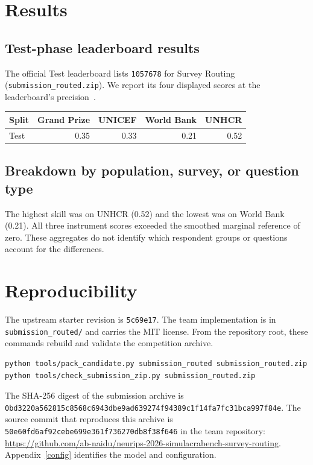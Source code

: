 \documentclass{article}
\begin{document}
\newpage
\section{Results}
\subsection{Test-phase leaderboard results}
The official Test leaderboard lists \texttt{1057678} for Survey Routing
(\texttt{submission\_routed.zip}). We report its four displayed scores at the
leaderboard's precision~\cite{leaderboard}.\\[4pt]
\begin{tabular}{@{}lrrrr@{}}\toprule Split & Grand Prize & UNICEF & World Bank & UNHCR\\\midrule
Test & 0.35 & 0.33 & 0.21 & 0.52\\\bottomrule\end{tabular}
\subsection{Breakdown by population, survey, or question type}
The highest skill was on UNHCR (0.52) and the lowest was on World Bank (0.21).
All three instrument scores exceeded the smoothed marginal reference of zero.
These aggregates do not identify which respondent groups or questions account
for the differences.

\section{Reproducibility}
The upstream starter revision is \texttt{5c69e17}. The team implementation
is in \texttt{submission\_routed/} and carries the MIT license. From the
repository root, these commands rebuild and validate the competition archive.
\begin{small}\begin{verbatim}
python tools/pack_candidate.py submission_routed submission_routed.zip
python tools/check_submission_zip.py submission_routed.zip
\end{verbatim}\end{small}
The SHA-256 digest of the submission archive is\\
{\small\texttt{0bd3220a562815c8568c6943dbe9ad639274f94389c1f14fa7fc31bca997f84e}}.
The source commit that reproduces this archive is\\
{\small\texttt{50e60fd6af92cebe699e361f736270db8f38f646}} in the team repository:\\
\url{https://github.com/ab-naidu/neurips-2026-simulacrabench-survey-routing}.
Appendix~\ref{config} identifies the model and configuration.
\end{document}
